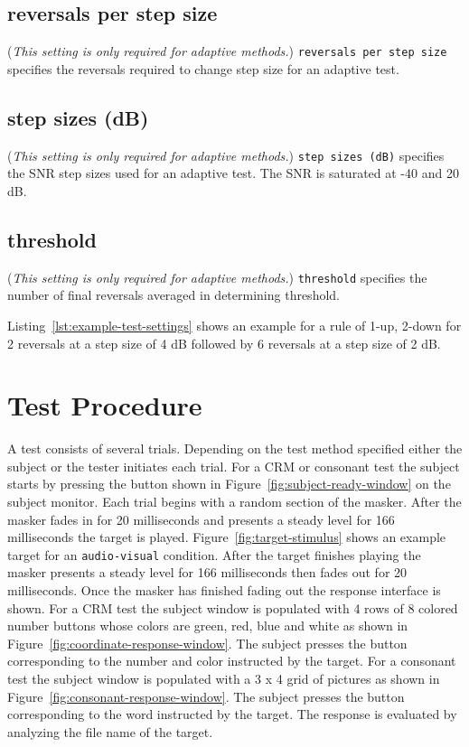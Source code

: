 \documentclass[11pt,pdftex,letterpaper]{article}
\begin{document}
\subsection{reversals per step size}
(\textit{This setting is only required for adaptive methods.}) \texttt{reversals per step size} specifies the reversals required to change step size for an adaptive test.
\subsection{step sizes (dB)}
(\textit{This setting is only required for adaptive methods.}) \texttt{step sizes (dB)} specifies the SNR step sizes used for an adaptive test. The SNR is saturated at -40 and 20 dB.
\subsection{threshold}
(\textit{This setting is only required for adaptive methods.}) \texttt{threshold} specifies the number of final reversals averaged in determining threshold.

\vspace{\baselineskip}
Listing~\ref{lst:example-test-settings} shows an example for a rule of 1-up, 2-down for 2 reversals at a step size of 4 dB followed by 6 reversals at a step size of 2 dB.

\section{Test Procedure}
A test consists of several trials. Depending on the test method specified either the subject or the tester initiates each trial. For a CRM or consonant test the subject starts by pressing the button shown in Figure~\ref{fig:subject-ready-window} on the subject monitor. Each trial begins with a random section of the masker. After the masker fades in for 20 milliseconds and presents a steady level for 166 milliseconds the target is played. Figure~\ref{fig:target-stimulus} shows an example target for an \texttt{audio-visual} condition. After the target finishes playing the masker presents a steady level for 166 milliseconds then fades out for 20 milliseconds. Once the masker has finished fading out the response interface is shown. For a CRM test the subject window is populated with 4 rows of 8 colored number buttons whose colors are green, red, blue and white as shown in Figure~\ref{fig:coordinate-response-window}. The subject presses the button corresponding to the number and color instructed by the target. For a consonant test the subject window is populated with a 3 x 4 grid of pictures as shown in Figure~\ref{fig:consonant-response-window}. The subject presses the button corresponding to the word instructed by the target. The response is evaluated by analyzing the file name of the target.
\end{document}
